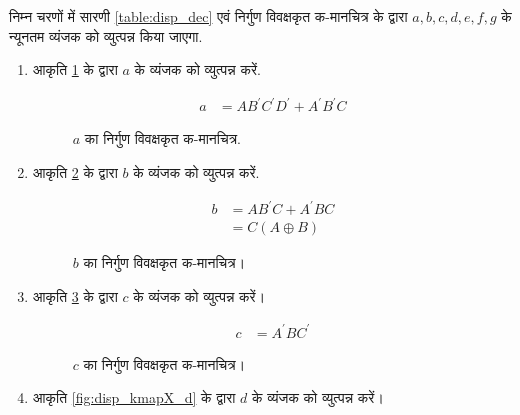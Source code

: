 निम्न  चरणों में सारणी \ref{table:disp_dec}  एवं  निर्गुण  विवक्षकृत  क-मानचित्र के द्वारा $a,b,c,d,e,f,g$ के न्यूनतम व्यंजक को व्युत्पन्न किया जाएगा.

\renewcommand{\theequation}{\theenumi}
\renewcommand{\thefigure}{\theenumi}
\begin{enumerate}[label=\thesubsection.\arabic*.,ref=\thesubsection.\theenumi]

\item आकृति \ref{fig:disp_kmapX_a} के द्वारा $a$ के व्यंजक को व्युत्पन्न करें.


\solution

\begin{align}
\label{eq:kmapX_disp_a}
a &= A B^{\prime}C^{\prime} D^{\prime} + A^{\prime}B^{\prime} C 
\end{align}
%
\begin{figure}[!ht]
\centering
\resizebox{\columnwidth}{!} {

}
\caption{$a$ का निर्गुण  विवक्षकृत क-मानचित्र.}
\label{fig:disp_kmapX_a}
\end{figure}
%

\item आकृति \ref{fig:disp_kmapX_b} के द्वारा $b$ के व्यंजक को व्युत्पन्न करें.


\solution

\begin{align}
\label{eq:kmapX_disp_b}
b &= A B^{\prime}C  + A^{\prime}B C 
\\
&= C (A\oplus B)
\end{align}
%


\begin{figure}[!ht]
\centering
\resizebox{\columnwidth}{!} {

}
\caption{$b$ का निर्गुण  विवक्षकृत क-मानचित्र।}
\label{fig:disp_kmapX_b}
\end{figure}
%
\item आकृति \ref{fig:disp_kmapX_c} के द्वारा $c$ के व्यंजक को व्युत्पन्न करें।


\solution

\begin{align}
\label{eq:kmapX_disp_c}
c &=  A^{\prime}B C^{\prime}
\end{align}
%
\begin{figure}[!ht]
\centering
\resizebox{\columnwidth}{!} {

}
\caption{$c$ का निर्गुण  विवक्षकृत क-मानचित्र।}
\label{fig:disp_kmapX_c}
\end{figure}
%
\item  आकृति \ref{fig:disp_kmapX_d} के द्वारा $d$ के व्यंजक को व्युत्पन्न करें।
\\
\solution



\end{enumerate}
